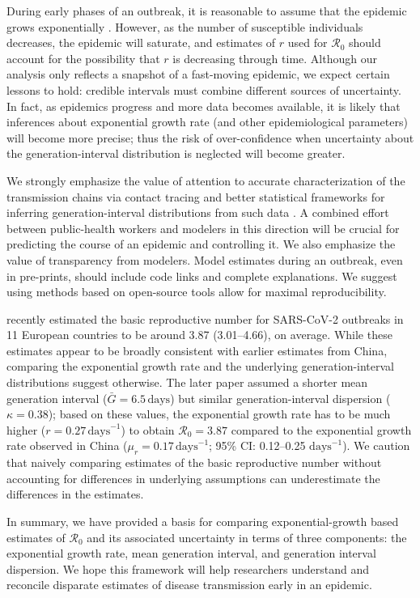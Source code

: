 \documentclass[12pt]{article}
\newcommand{\Ro}{\ensuremath{{\mathcal R}_{0}}\xspace}
\begin{document}
During early phases of an outbreak, it is reasonable to assume that the epidemic grows exponentially \citep{anderson1991infectious}.
However, as the number of susceptible individuals decreases, the epidemic will saturate, and estimates of $r$ used for \Ro should account for the possibility that $r$ is decreasing through time.
Although our analysis only reflects a snapshot of a fast-moving epidemic, we expect certain lessons to hold: credible intervals must combine different sources of uncertainty. 
In fact, as epidemics progress and more data becomes available, it is likely that inferences about exponential growth rate (and other epidemiological parameters) will become more precise; thus the risk of over-confidence when uncertainty about the generation-interval distribution is neglected will become greater.

We strongly emphasize the value of attention to accurate characterization of the transmission chains via contact tracing and better statistical frameworks for inferring generation-interval distributions from such data \citep{britton2019estimation}.
A combined effort between public-health workers and modelers in this direction will be crucial for predicting the course of an epidemic and controlling it.
We also emphasize the value of transparency from modelers.
Model estimates during an outbreak, even in pre-prints, should include code links and complete explanations.
We suggest using methods based on open-source tools allow for maximal reproducibility.

\cite{flaxman2020estimating} recently estimated the basic reproductive number for SARS-CoV-2 outbreaks in 11 European countries to be around 3.87 (3.01--4.66), on average.
While these estimates appear to be broadly consistent with earlier estimates from China, comparing the exponential growth rate and the underlying generation-interval distributions suggest otherwise.
The later paper assumed a shorter mean generation interval ($\bar G = 6.5\,\textrm{days}$) but similar generation-interval dispersion ($\kappa = 0.38$);
based on these values, the exponential growth rate has to be much higher ($r = 0.27\,\textrm{days}^{-1}$) to obtain $\Ro = 3.87$ compared to the exponential growth rate observed in China ($\mu_r = 0.17\,\textrm{days}^{-1}$; 95\% CI: 0.12--0.25 $\textrm{days}^{-1}$).
We caution that naively comparing estimates of the basic reproductive number without accounting for differences in underlying assumptions can underestimate the differences in the estimates.

In summary, we have provided a basis for comparing exponential-growth based estimates of \Ro and its associated uncertainty in terms of three components: the exponential growth rate, mean generation interval, and generation interval dispersion. 
We hope this framework will help researchers understand and reconcile disparate estimates of disease transmission early in an epidemic.
\end{document}
